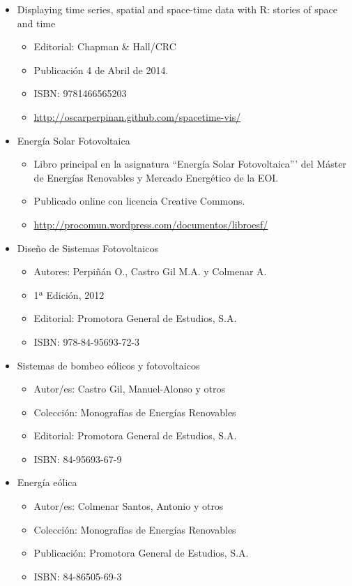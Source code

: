 \documentclass[article, a4paper]{memoir}
\begin{document}
\begin{itemize}
\item Displaying time series, spatial and space-time data with R: stories of space and time
\begin{itemize}
\item Editorial: Chapman \& Hall/CRC
\item Publicación 4 de Abril de 2014.
\item ISBN: 9781466565203
\item \url{http://oscarperpinan.github.com/spacetime-vis/}
\end{itemize}

\item Energía Solar Fotovoltaica

\begin{itemize}
\item Libro principal en la asignatura ``Energía Solar
Fotovoltaica''' del Máster de Energías Renovables y Mercado
Energético de la EOI.
\item Publicado online con licencia Creative Commons.
\item \url{http://procomun.wordpress.com/documentos/libroesf/}
\end{itemize}

\item Diseño de Sistemas Fotovoltaicos

\begin{itemize}
\item Autores: Perpiñán O., Castro Gil M.A. y Colmenar A.
\item 1ª Edición, 2012
\item Editorial: Promotora General de Estudios, S.A.
\item ISBN: 978-84-95693-72-3
\end{itemize}

\item Sistemas de bombeo eólicos y fotovoltaicos

\begin{itemize}
\item Autor/es: Castro Gil, Manuel-Alonso y otros
\item Colección: Monografías de Energías Renovables
\item Editorial: Promotora General de Estudios, S.A.
\item ISBN: 84-95693-67-9
\end{itemize}

\item Energía eólica

\begin{itemize}
\item Autor/es: Colmenar Santos, Antonio y otros
\item Colección: Monografías de Energías Renovables
\item Publicación: Promotora General de Estudios, S.A.
\item ISBN: 84-86505-69-3
\end{itemize}
\end{itemize}
\end{document}
